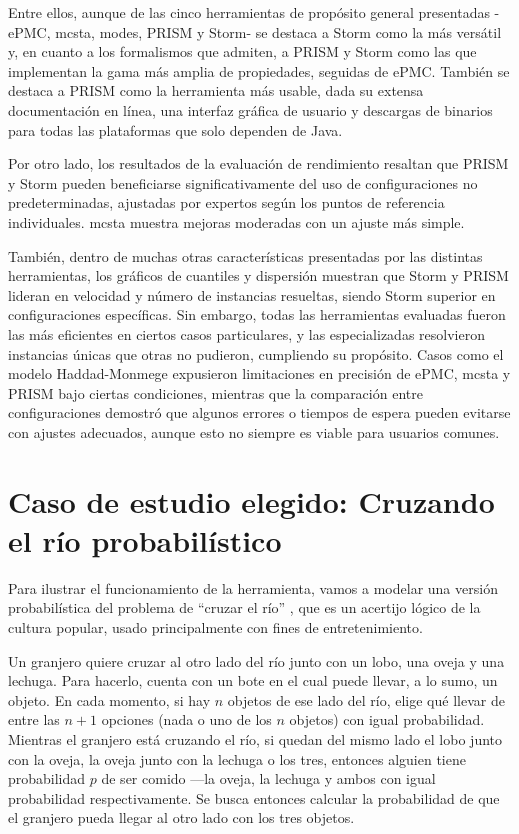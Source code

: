 \documentclass[runningheads]{llncs}
\begin{document}
Entre ellos, aunque de las cinco herramientas de propósito general presentadas -ePMC, mcsta, modes, PRISM y Storm- se destaca a Storm como la más versátil y, en cuanto a los formalismos que admiten, a PRISM y Storm como las que implementan la gama más amplia de propiedades, seguidas de ePMC. También se destaca a PRISM como la herramienta más usable, dada su extensa documentación en línea, una interfaz gráfica de usuario y descargas de binarios para todas las plataformas que solo dependen de Java.

Por otro lado, los resultados de la evaluación de rendimiento resaltan que PRISM y Storm pueden beneficiarse significativamente del uso de configuraciones no predeterminadas, ajustadas por expertos según los puntos de referencia individuales. mcsta muestra mejoras moderadas con un ajuste más simple.

También, dentro de muchas otras características presentadas por las distintas herramientas, los gráficos de cuantiles y dispersión muestran que Storm y PRISM lideran en velocidad y número de instancias resueltas, siendo Storm superior en configuraciones específicas. Sin embargo, todas las herramientas evaluadas fueron las más eficientes en ciertos casos particulares, y las especializadas resolvieron instancias únicas que otras no pudieron, cumpliendo su propósito. Casos como el modelo Haddad-Monmege expusieron limitaciones en precisión de ePMC, mcsta y PRISM bajo ciertas condiciones, mientras que la comparación entre configuraciones demostró que algunos errores o tiempos de espera pueden evitarse con ajustes adecuados, aunque esto no siempre es viable para usuarios comunes.

\section{Caso de estudio elegido: Cruzando el río probabilístico}
Para ilustrar el funcionamiento de la herramienta, vamos a modelar una versión probabilística del problema de ``cruzar el río'' \cite{Voolaid2007}, que es un acertijo lógico de la cultura popular, usado principalmente con fines de entretenimiento.

Un granjero quiere cruzar al otro lado del río junto con un lobo, una oveja y una lechuga. Para hacerlo, cuenta con un bote en el cual puede llevar, a lo sumo, un objeto. En cada momento, si hay $n$ objetos de ese lado del río, elige qué llevar de entre las $n+1$ opciones (nada o uno de los $n$ objetos) con igual probabilidad. Mientras el granjero está cruzando el río, si quedan del mismo lado el lobo junto con la oveja, la oveja junto con la lechuga o los tres, entonces alguien tiene probabilidad $p$ de ser comido —la oveja, la lechuga y ambos con igual probabilidad respectivamente. Se busca entonces calcular la probabilidad de que el granjero pueda llegar al otro lado con los tres objetos.
\end{document}
